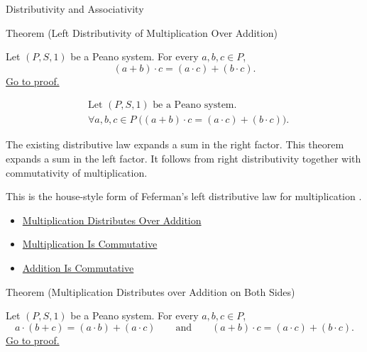 \begin{topicbox}{Distributivity and Associativity}
\begin{theorembox}{Theorem (Left Distributivity of Multiplication Over Addition)}
\begin{theorem}
\label{thm:left-distributivity-of-multiplication-over-addition}
Let $(P,S,1)$ be a Peano system. For every $a,b,c \in P$,
\[
(a+b)\cdot c=(a\cdot c)+(b\cdot c).
\]
\hyperref[prf:left-distributivity-of-multiplication-over-addition]{Go to proof.}
\end{theorem}
\end{theorembox}

\begin{remark*}
\[
\begin{aligned}
&\text{Let } (P,S,1) \text{ be a Peano system.}\\
&\forall a,b,c \in P\;\bigl((a+b)\cdot c=(a\cdot c)+(b\cdot c)\bigr).
\end{aligned}
\]
\end{remark*}

\begin{remark*}[Interpretation]
The existing distributive law expands a sum in the right factor. This theorem
expands a sum in the left factor. It follows from right distributivity together
with commutativity of multiplication.
\end{remark*}

\begin{remark*}
This is the house-style form of Feferman's left distributive law for
multiplication \citep{FefermanNumberSystems1964}.
\end{remark*}

\begin{dependencies}
\begin{itemize}
  \item \hyperref[thm:multiplication-distributes-over-addition]{Multiplication Distributes Over Addition}
  \item \hyperref[thm:multiplication-commutative]{Multiplication Is Commutative}
  \item \hyperref[thm:addition-commutative]{Addition Is Commutative}
\end{itemize}
\end{dependencies}

\begin{theorembox}{Theorem (Multiplication Distributes over Addition on Both Sides)}
\begin{theorem}
\label{thm:multiplication-distributes-over-addition-both-sides}
Let $(P,S,1)$ be a Peano system. For every $a,b,c \in P$,
\[
a\cdot(b+c)=(a\cdot b)+(a\cdot c)
\qquad\text{and}\qquad
(a+b)\cdot c=(a\cdot c)+(b\cdot c).
\]
\hyperref[prf:multiplication-distributes-over-addition-both-sides]{Go to proof.}
\end{theorem}
\end{theorembox}


\end{topicbox}
